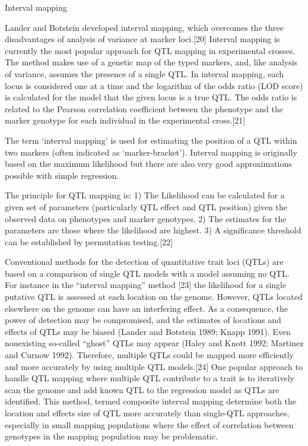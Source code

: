 Interval mapping

Lander and Botstein developed interval mapping, which overcomes the three disadvantages of analysis of variance at marker loci.{[}20{]} Interval mapping is currently the most popular approach for QTL mapping in experimental crosses. The method makes use of a genetic map of the typed markers, and, like analysis of variance, assumes the presence of a single QTL. In interval mapping, each locus is considered one at a time and the logarithm of the odds ratio (LOD score) is calculated for the model that the given locus is a true QTL. The odds ratio is related to the Pearson correlation coefficient between the phenotype and the marker genotype for each individual in the experimental cross.{[}21{]}

The term `interval mapping' is used for estimating the position of a QTL within two markers (often indicated as `marker-bracket'). Interval mapping is originally based on the maximum likelihood but there are also very good approximations possible with simple regression.

The principle for QTL mapping is: 1) The Likelihood can be calculated for a given set of parameters (particularly QTL effect and QTL position) given the observed data on phenotypes and marker genotypes. 2) The estimates for the parameters are those where the likelihood are highest. 3) A significance threshold can be established by permutation testing.{[}22{]}

Conventional methods for the detection of quantitative trait loci (QTLs) are based on a comparison of single QTL models with a model assuming no QTL. For instance in the ``interval mapping'' method {[}23{]} the likelihood for a single putative QTL is assessed at each location on the genome. However, QTLs located elsewhere on the genome can have an interfering effect. As a consequence, the power of detection may be compromised, and the estimates of locations and effects of QTLs may be biased (Lander and Botstein 1989; Knapp 1991). Even nonexisting so-called ``ghost'' QTLs may appear (Haley and Knott 1992; Martinez and Curnow 1992). Therefore, multiple QTLs could be mapped more efficiently and more accurately by using multiple QTL models.{[}24{]} One popular approach to handle QTL mapping where multiple QTL contribute to a trait is to iteratively scan the genome and add known QTL to the regression model as QTLs are identified. This method, termed composite interval mapping determine both the location and effects size of QTL more accurately than single-QTL approaches, especially in small mapping populations where the effect of correlation between genotypes in the mapping population may be problematic.

